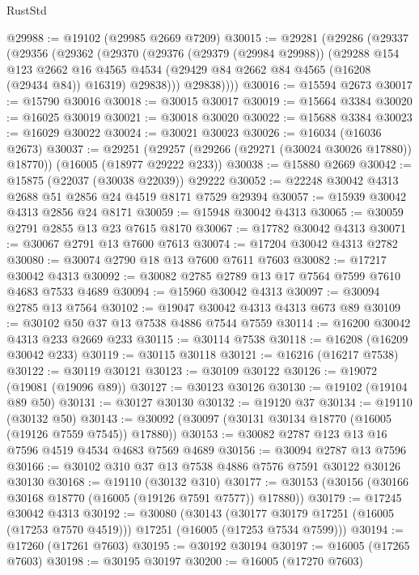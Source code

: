 \begin{lexlean}{RustStd}
\begin{coremodule}
@29988 := @19102 (@29985 @2669 @7209)
@30015 := @29281
    (@29286
      (@29337
        (@29356
          (@29362
            (@29370
              (@29376
                (@29379 (@29984 @29988))
                (@29288
                  @154
                  @123
                  @2662
                  @16
                  @4565
                  @4534
                  (@29429 @84 @2662 @84 @4565 (@16208 (@29434 @84)) @16319)
                  @29838)))
            @29838))))
@30016 := @15594 @2673
@30017 := @15790 @30016
@30018 := @30015 @30017
@30019 := @15664 @3384
@30020 := @16025 @30019
@30021 := @30018 @30020
@30022 := @15688 @3384
@30023 := @16029 @30022
@30024 := @30021 @30023
@30026 := @16034 (@16036 @2673)
@30037 := @29251
    (@29257 (@29266 (@29271 (@30024 @30026 @17880)) @18770))
    (@16005 (@18977 @29222 @233))
@30038 := @15880 @2669
@30042 := @15875 (@22037 (@30038 @22039)) @29222
@30052 := @22248 @30042 @4313 @2688 @51 @2856 @24 @4519 @8171 @7529 @29394
@30057 := @15939 @30042 @4313 @2856 @24 @8171
@30059 := @15948 @30042 @4313
@30065 := @30059 @2791 @2855 @13 @23 @7615 @8170
@30067 := @17782 @30042 @4313
@30071 := @30067 @2791 @13 @7600 @7613
@30074 := @17204 @30042 @4313 @2782
@30080 := @30074 @2790 @18 @13 @7600 @7611 @7603
@30082 := @17217 @30042 @4313
@30092 := @30082 @2785 @2789 @13 @17 @7564 @7599 @7610 @4683 @7533 @4689
@30094 := @15960 @30042 @4313
@30097 := @30094 @2785 @13 @7564
@30102 := @19047 @30042 @4313 @4313 @673 @89
@30109 := @30102 @50 @37 @13 @7538 @4886 @7544 @7559
@30114 := @16200 @30042 @4313 @233 @2669 @233
@30115 := @30114 @7538
@30118 := @16208 (@16209 @30042 @233)
@30119 := @30115 @30118
@30121 := @16216 (@16217 @7538)
@30122 := @30119 @30121
@30123 := @30109 @30122
@30126 := @19072 (@19081 (@19096 @89))
@30127 := @30123 @30126
@30130 := @19102 (@19104 @89 @50)
@30131 := @30127 @30130
@30132 := @19120 @37
@30134 := @19110 (@30132 @50)
@30143 := @30092 (@30097 (@30131 @30134 @18770 (@16005 (@19126 @7559 @7545)) @17880))
@30153 := @30082 @2787 @123 @13 @16 @7596 @4519 @4534 @4683 @7569 @4689
@30156 := @30094 @2787 @13 @7596
@30166 := @30102 @310 @37 @13 @7538 @4886 @7576 @7591 @30122 @30126 @30130
@30168 := @19110 (@30132 @310)
@30177 := @30153 (@30156 (@30166 @30168 @18770 (@16005 (@19126 @7591 @7577)) @17880))
@30179 := @17245 @30042 @4313
@30192 := @30080
    (@30143
      (@30177 @30179 @17251 (@16005 (@17253 @7570 @4519)))
      @17251
      (@16005 (@17253 @7534 @7599)))
@30194 := @17260 (@17261 @7603)
@30195 := @30192 @30194
@30197 := @16005 (@17265 @7603)
@30198 := @30195 @30197
@30200 := @16005 (@17270 @7603)

\end{coremodule}
\end{lexlean}
